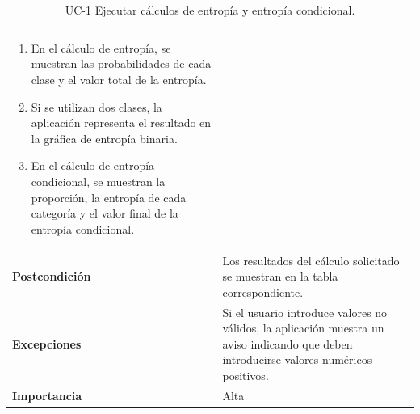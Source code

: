 \begin{table}[p]
\begin{tabularx}{\linewidth}{p{} p{}}
\begin{enumerate}
            \begin{enumerate}
                \item En el cálculo de entropía, se muestran las probabilidades de cada clase y el valor total de la entropía.
                \item Si se utilizan dos clases, la aplicación representa el resultado en la gráfica de entropía binaria.
                \item En el cálculo de entropía condicional, se muestran la proporción, la entropía de cada categoría y el valor final de la entropía condicional.
            \end{enumerate}
        \end{enumerate} \\
        \textbf{Postcondición} & Los resultados del cálculo solicitado se muestran en la tabla correspondiente. \\
        \textbf{Excepciones} & Si el usuario introduce valores no válidos, la aplicación muestra un aviso indicando que deben introducirse valores numéricos positivos. \\
        \textbf{Importancia} & Alta \\
        \bottomrule
    \end{tabularx}
    \caption{UC-1 Ejecutar cálculos de entropía y entropía condicional.}
    \label{tabla:uc_1}
\end{table}


